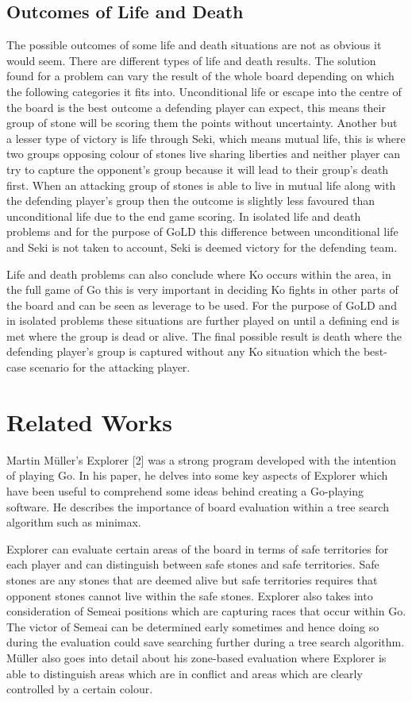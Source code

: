 \documentclass{l4proj}
\begin{document}
\subsection{Outcomes of Life and Death}
The possible outcomes of some life and death situations are not as obvious it would seem. There are different types of life and death results. The solution found for a problem can vary the result of the whole board depending on which the following categories it fits into.
Unconditional life or escape into the centre of the board is the best outcome a defending player can expect, this means their group of stone will be scoring them the points without uncertainty. Another but a lesser type of victory is life through Seki, which means mutual life, this is where two groups opposing colour of stones live sharing liberties and neither player can try to capture the opponent’s group because it will lead to their group’s death first. When an attacking group of stones is able to live in mutual life along with the defending player’s group then the outcome is slightly less favoured than unconditional life due to the end game scoring. In isolated life and death problems and for the purpose of GoLD this difference between unconditional life and Seki is not taken to account, Seki is deemed victory for the defending team.

Life and death problems can also conclude where Ko occurs within the area, in the full game of Go this is very important in deciding Ko fights in other parts of the board and can be seen as leverage to be used.  For the purpose of GoLD and in isolated problems these situations are further played on until a defining end is met where the group is dead or alive. The final possible result is death where the defending player’s group is captured without any Ko situation which the best-case scenario for the attacking player.


\section{Related Works}

Martin Müller's Explorer [2] was a strong program developed with the intention of playing Go. In his paper, he delves into some key aspects of Explorer which have been useful to comprehend some ideas behind creating a Go-playing software. He describes the importance of board evaluation within a tree search algorithm such as minimax.

Explorer can evaluate certain areas of the board in terms of safe territories for each player and can distinguish between safe stones and safe territories. Safe stones are any stones that are deemed alive but safe territories requires that opponent stones cannot live within the safe stones. Explorer also takes into consideration of Semeai positions which are capturing races that occur within Go. The victor of Semeai can be determined early sometimes and hence doing so during the evaluation could save searching further during a tree search algorithm. Müller also goes into detail about his zone-based evaluation where Explorer is able to distinguish areas which are in conflict and areas which are clearly controlled by a certain colour.
\end{document}
